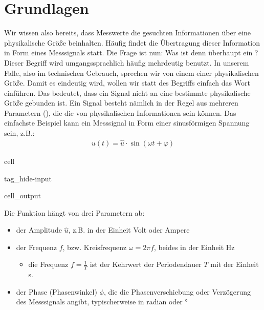 \documentclass[letterpaper,10pt,english]{jupyterBook}
\begin{document}
\section{Grundlagen}
\label{\detokenize{content/3_basics:grundlagen}}\label{\detokenize{content/3_basics::doc}}
\sphinxAtStartPar
Wir wissen also bereits, dass Messwerte die gesuchten Informationen über eine physikalische Größe beinhalten. Häufig findet die Übertragung dieser Information in Form eines Messsignals statt. Die Frage ist nun: Was ist denn überhaupt ein ? Dieser Begriff wird umgangssprachlich häufig mehrdeutig benutzt. In unserem Falle, also im technischen Gebrauch, sprechen wir von einem  einer physikalischen Größe. Damit es eindeutig wird, wollen wir statt des Begriffs  einfach das Wort  einführen. Das bedeutet, dass ein Signal nicht an eine bestimmte physikalische Größe gebunden ist. Ein Signal besteht nämlich in der Regel aus mehreren Parametern (), die die  von physikalischen Informationen sein können. Das einfachste Beispiel kann ein Messsignal in Form einer sinusförmigen Spannung sein, z.B.:
\begin{equation*}
\begin{split}u(t) = \hat u \cdot \sin(\omega t + \varphi)\end{split}
\end{equation*}
\begin{sphinxuseclass}{cell}
\begin{sphinxuseclass}{tag_hide-input}\begin{sphinxVerbatimOutput}

\begin{sphinxuseclass}{cell_output}
\noindent{}

\end{sphinxuseclass}\end{sphinxVerbatimOutput}

\end{sphinxuseclass}
\end{sphinxuseclass}
\sphinxAtStartPar
Die Funktion hängt von drei Parametern ab:
\begin{itemize}
\item {} 
\sphinxAtStartPar
der Amplitude \(\hat u\), z.B. in der Einheit Volt oder Ampere

\item {} 
\sphinxAtStartPar
der Frequenz \(f\), bzw. Kreisfrequenz \(\omega = 2\pi f\), beides in der Einheit Hz
\begin{itemize}
\item {} 
\sphinxAtStartPar
die Frequenz \(f = \frac{1}{T}\) ist der Kehrwert der Periodendauer \(T\) mit der Einheit s.

\end{itemize}

\item {} 
\sphinxAtStartPar
der Phase (Phasenwinkel) \(\phi\), die die Phasenverschiebung oder Verzögerung des Messsignals angibt, typischerweise in radian oder °

\end{itemize}
\end{document}
